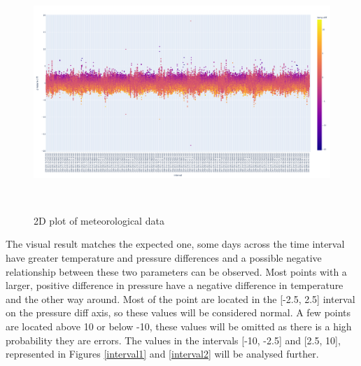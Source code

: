 \documentclass{article}
\begin{document}
\begin{figure}[h!] 
\centering
\includegraphics[height=9cm]{newplot (1).png}
\caption{2D plot of meteorological data} 
\label{figure2DColor}
\end{figure}

\newpage

The visual result matches the expected one, some days across the time interval have greater temperature and pressure differences and a possible negative relationship between these two parameters can be observed. Most points with a larger, positive difference in pressure have a negative difference in temperature and the other way around. Most of the point are located in the [-2.5, 2.5] interval on the pressure diff axis, so these values will be considered normal. A few points are located above 10 or below -10, these values will be omitted as there is a high probability they are errors. The values in the intervals [-10, -2.5] and [2.5, 10], represented in Figures \ref{interval1} and \ref{interval2} will be analysed further.
\end{document}
